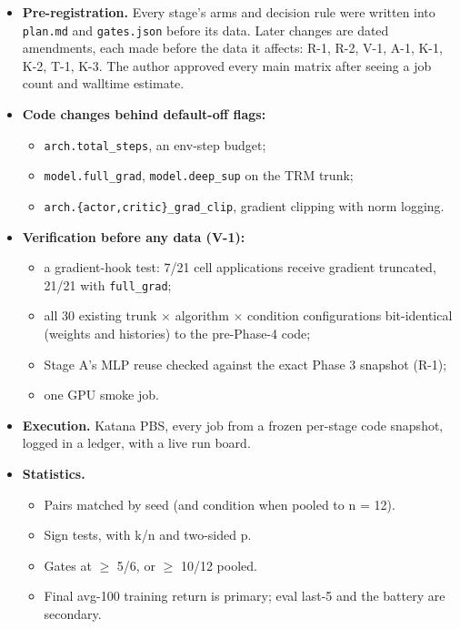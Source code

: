 \documentclass[11pt]{article}
\begin{document}
\begin{itemize}
\item \textbf{Pre-registration.} Every stage's arms and decision rule were written into \texttt{plan.md} and \texttt{gates.json} before its data. Later changes are dated amendments, each made before the data it affects: R-1, R-2, V-1, A-1, K-1, K-2, T-1, K-3. The author approved every main matrix after seeing a job count and walltime estimate.
\item \textbf{Code changes behind default-off flags:}
\begin{itemize}
\item \texttt{arch.\allowbreak{}total\_\allowbreak{}steps}, an env-step budget;
\item \texttt{model.\allowbreak{}full\_\allowbreak{}grad}, \texttt{model.\allowbreak{}deep\_\allowbreak{}sup} on the TRM trunk;
\item \texttt{arch.\allowbreak{}\{actor,\allowbreak{}critic\}\_\allowbreak{}grad\_\allowbreak{}clip}, gradient clipping with norm logging.
\end{itemize}
\item \textbf{Verification before any data (V-1):}
\begin{itemize}
\item a gradient-hook test: 7/21 cell applications receive gradient truncated, 21/21 with \texttt{full\_grad};
\item all 30 existing trunk $\times$ algorithm $\times$ condition configurations bit-identical (weights and histories) to the pre-Phase-4 code;
\item Stage A's MLP reuse checked against the exact Phase 3 snapshot (R-1);
\item one GPU smoke job.
\end{itemize}
\item \textbf{Execution.} Katana PBS, every job from a frozen per-stage code snapshot, logged in a ledger, with a live run board.
\item \textbf{Statistics.}
\begin{itemize}
\item Pairs matched by seed (and condition when pooled to n = 12).
\item Sign tests, with k/n and two-sided p.
\item Gates at $\geq$ 5/6, or $\geq$ 10/12 pooled.
\item Final avg-100 training return is primary; eval last-5 and the battery are secondary.
\end{itemize}
\end{itemize}
\end{document}
